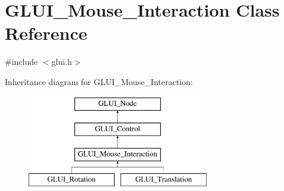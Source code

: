 \hypertarget{classGLUI__Mouse__Interaction}{\section{G\-L\-U\-I\-\_\-\-Mouse\-\_\-\-Interaction Class Reference}
\label{classGLUI__Mouse__Interaction}
}


{\ttfamily \#include $<$glui.\-h$>$}

Inheritance diagram for G\-L\-U\-I\-\_\-\-Mouse\-\_\-\-Interaction\-:\begin{figure}[H]
\begin{center}
\leavevmode
\includegraphics[height=4.000000cm]{classGLUI__Mouse__Interaction}
\end{center}
\end{figure}

